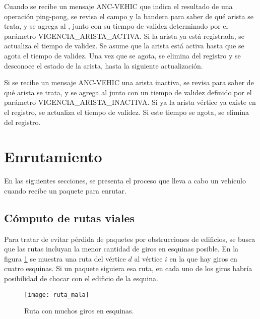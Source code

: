 Cuando se recibe un mensaje ANC-VEHIC que indica el resultado de una operación
ping-pong, se revisa el campo  y la bandera
 para saber de qué arista se trata, y se agrega al , junto con su tiempo de validez determinado por el
parámetro VIGENCIA\_ARISTA\_ACTIVA. Si la arista ya está registrada, se
actualiza el tiempo de validez. Se asume que la arista está activa hasta que
se agota el tiempo de validez. Una vez que se agota, se elimina del registro y
se desconoce el estado de la arista, hasta la siguiente actualización.

Si se recibe un mensaje ANC-VEHIC una arista inactiva, se revisa para saber de
qué arista se trata, y se agrega al 
junto con un tiempo de validez definido por el parámetro
VIGENCIA\_ARISTA\_INACTIVA. Si ya la arista vértice ya existe en el registro,
se actualiza el tiempo de validez. Si este tiempo se agota, se elimina del
registro.

\section{Enrutamiento}

\label{sec:enrutamiento}

En las siguientes secciones, se presenta el proceso que lleva a cabo un vehículo
cuando recibe un paquete para enrutar.

\subsection{Cómputo de rutas viales}

\label{subsec:computo_rutas_viales}

Para tratar de evitar pérdida de paquetes por obstrucciones de edificios, se
busca que las rutas incluyan la menor cantidad de giros en esquinas posible.
En la figura \ref{fig:ruta_mala} se muestra una ruta del vértice $d$ al vértice
$i$ en la que hay giros en cuatro esquinas. Si un paquete siguiera esa ruta, en
cada uno de los giros habría posibilidad de chocar con el edificio de la
esquina.

\begin{figure}[th!]
\centering
\texttt{[image: ruta\_mala]}
\decoRule
\caption[Ruta con muchos giros en esquinas]{Ruta con muchos giros en
esquinas.}
\label{fig:ruta_mala}
\end{figure}

